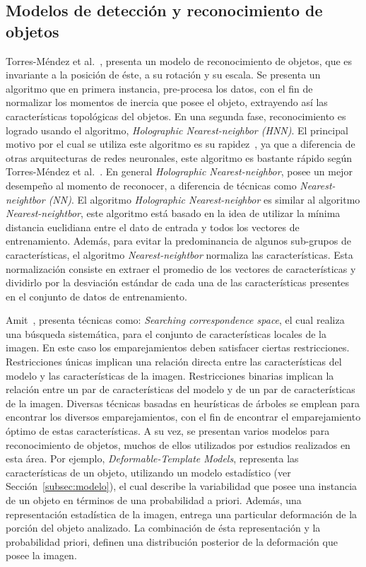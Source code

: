 \begin{definition}[Descriptor]

\end{definition}


\subsection{Modelos de detección y reconocimiento de objetos}
Torres-Méndez et al.~\cite{trsi2000}, presenta un modelo de reconocimiento de objetos, que es invariante a la posición de éste, a su rotación y su escala. Se presenta un algoritmo que en primera instancia, pre-procesa los datos, con el fin de normalizar los momentos de inercia que posee el objeto, extrayendo así las características topológicas del objetos. En una segunda fase, reconocimiento es logrado usando el algoritmo, \textit{Holographic Nearest-neighbor (HNN)}. El principal motivo por el cual se utiliza este algoritmo es su rapidez~\cite{trsi2000}, ya que a diferencia de otras arquitecturas de redes neuronales, este algoritmo es bastante rápido según Torres-Méndez et al.~\cite{trsi2000}. En general \textit{Holographic Nearest-neighbor}, posee un mejor desempeño al momento de reconocer, a diferencia de técnicas como \textit{Nearest-neightbor (NN)}. El algoritmo \textit{Holographic Nearest-neighbor} es similar al algoritmo \textit{Nearest-neightbor}, este algoritmo está basado en la idea de utilizar la mínima distancia euclidiana entre el dato de entrada y todos los vectores de entrenamiento. Además, para evitar la predominancia de algunos sub-grupos de características, el algoritmo \textit{Nearest-neightbor} normaliza las características. Esta normalización consiste en extraer el promedio de los vectores de características y dividirlo por la desviación estándar de cada una de las características presentes en el conjunto de datos de entrenamiento.

Amit~\cite{Amit2002}, presenta técnicas como: \textit{Searching correspondence space}, el cual realiza una búsqueda sistemática, para el conjunto de características locales de la imagen. En este caso los emparejamientos deben satisfacer ciertas restricciones. Restricciones únicas implican una relación directa entre las características del modelo y las características de la imagen. Restricciones binarias implican la relación entre un par de características del modelo y de un par de características de la imagen. Diversas técnicas basadas en heurísticas de árboles se emplean para encontrar los diversos emparejamientos, con el fin de encontrar el emparejamiento óptimo de estas características. A su vez, se presentan varios modelos para reconocimiento de objetos, muchos de ellos utilizados por estudios realizados en esta área. Por ejemplo, \textit{Deformable-Template Models}, representa las características de un objeto, utilizando un modelo estadístico (ver Sección~\ref{subsec:modelo}), el cual describe la variabilidad que posee una instancia de un objeto en términos de una probabilidad a priori. Además, una representación  estadística de la imagen, entrega una particular deformación de la porción del objeto analizado. La combinación de ésta representación y la probabilidad priori, definen una distribución posterior de la deformación que posee la imagen.

